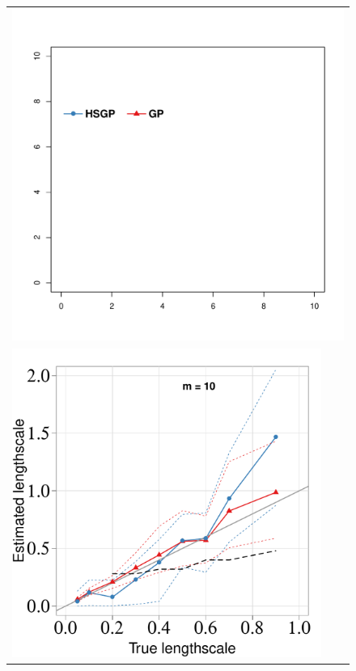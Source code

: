 \documentclass[]{interact}
\theoremstyle{plain}%
\theoremstyle{definition}
\theoremstyle{remark}
\begin{document}
\begin{figure}
\begin{flushleft}
\begin{tabular}{ccc}
\multicolumn{3}{c}{ \includegraphics[scale=0.40, trim = 25mm 115mm 90mm 45mm, clip]{fig8_legend.pdf}}\\
\includegraphics[scale=0.30, trim = 0mm 24mm 7mm 10mm, clip]{fig8_Tlscale_vs_Elscale_part1.pdf} & \hspace{-4mm}

\end{tabular}
\end{flushleft}
\end{figure}
\end{document}
